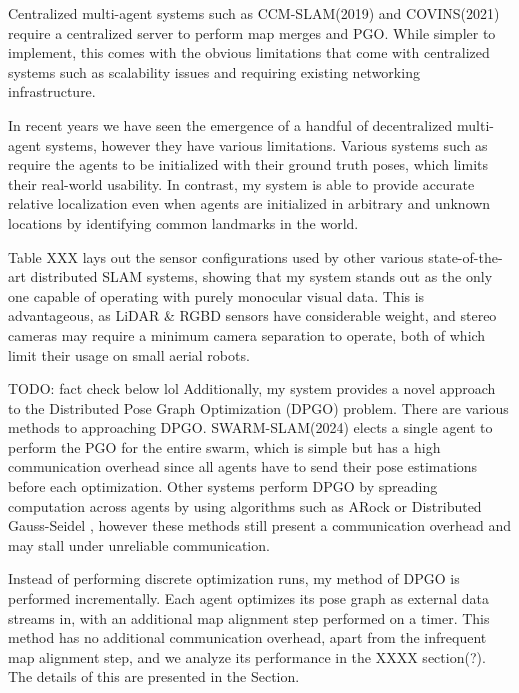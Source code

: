 Centralized multi-agent systems such as CCM-SLAM(2019) \autocite{schmuck2019ccm} and COVINS(2021) \autocite{schmuck2021covins} require a centralized server to perform map merges and PGO. While simpler to implement, this comes with the obvious limitations that come with centralized systems such as scalability issues and requiring existing networking infrastructure.

In recent years we have seen the emergence of a handful of decentralized multi-agent systems, however they have various limitations. Various systems such as \autocite{doi:10.1126/scirobotics.abm5954} \autocite{8658783} \autocite{DBLP:journals/corr/abs-2103-12770} require the agents to be initialized with their ground truth poses, which limits their real-world usability. In contrast, my system is able to provide accurate relative localization even when agents are initialized in arbitrary and unknown locations by identifying common landmarks in the world.

Table XXX lays out the sensor configurations used by other various state-of-the-art distributed SLAM systems, showing that my system stands out as the only one capable of operating with purely monocular visual data. This is advantageous, as LiDAR \& RGBD sensors have considerable weight, and stereo cameras may require a minimum camera separation to operate, both of which limit their usage on small aerial robots.


TODO: fact check below lol
Additionally, my system provides a novel approach to the Distributed Pose Graph Optimization (DPGO) problem. There are various methods to approaching DPGO. SWARM-SLAM(2024) \autocite{Lajoie_2024} elects a single agent to perform the PGO for the entire swarm, which is simple but has a high communication overhead since all agents have to send their pose estimations before each optimization. Other systems perform DPGO by spreading computation across agents by using algorithms such as ARock \autocite{Peng_2016} or Distributed Gauss-Seidel \autocite{DBLP:journals/corr/ChoudharyCNRCD17}, however these methods still present a communication overhead and may stall under unreliable communication.

Instead of performing discrete optimization runs, my method of DPGO is performed incrementally. Each agent optimizes its pose graph as external data streams in, with an additional map alignment step performed on a timer. This method has no additional communication overhead, apart from the infrequent map alignment step, and we analyze its performance in the XXXX section(?). The details of this are presented in the  Section.


